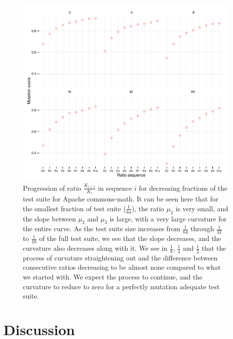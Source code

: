 \documentclass[conference]{IEEEtran}
\begin{document}
\begin{figure}
\begin{Schunk}


{\centering \includegraphics[width=.99\linewidth]{twocolumn-unnamed-chunk-24} 

}

\end{Schunk}

\caption{Progression of ratio $\frac{K_{i+1}}{K_i}$ in sequence $i$ for decreasing fractions
of the test suite for Apache commons-math.
It can be seen here that for the smallest fraction of test suite ($\frac{1}{64}$), the ratio $\mu_2$ is very small, and the slope between $\mu_2$ and $\mu_3$ is large, with a very large curvature for the entire curve. As the test suite size increases from $\frac{1}{64}$ through $\frac{1}{32}$ to $\frac{1}{16}$ of the full test suite, we see that the slope decreases, and the curvature also decreases along with it. We see in $\frac{1}{8}$, $\frac{1}{4}$ and $\frac{1}{2}$ that the process of curvature straightening out and the difference between consecutive ratios decreasing to be almost none compared to what we started with. We expect the process to continue, and the curvature to reduce to zero for a perfectly mutation adequate test suite.}
\label{fig:amtcfrac}
\end{figure}





\section{Discussion}
\label{sec:discussion}
\end{document}
